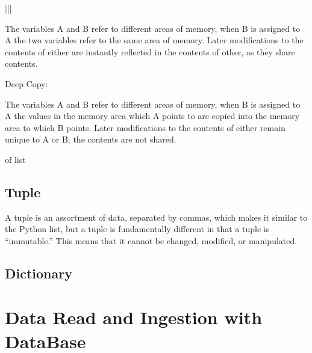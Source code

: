 \documentclass[letterpaper,12pt,english]{sphinxmanual}
\def\X{\mathbf{X}}
\begin{document}
\begin{savenotes}
\begin{tabular}[t]{|*{2}{\X{1}{2}|}}
\begin{footnote}[1]
The variables A and B refer to different areas of memory, when B is assigned to A the two variables refer to the same area of memory. Later modifications to the contents of either are instantly reflected in the contents of other, as they share contents.

Deep Copy:
\begin{quote}
\begin{sphinxfigure-in-table}
\centering

\noindent{}
\end{sphinxfigure-in-table}\relax
\end{quote}

The variables A and B refer to different areas of memory, when B is assigned to A the values in the memory area which A points to are copied into the memory area to which B points. Later modifications to the contents of either remain unique to A or B; the contents are not shared.
%
\end{footnote} of list
\\
\hline
\end{tabular}
\par
\sphinxattableend\end{savenotes}


\section{Tuple}
\label{\detokenize{struct:tuple}}
A tuple is an assortment of data, separated by commas, which makes it similar to the Python list, but a tuple is fundamentally different in that a tuple is “immutable.” This means that it cannot be changed, modified, or manipulated.


\section{Dictionary}
\label{\detokenize{struct:dictionary}}
  


\chapter{Data Read and Ingestion with DataBase}
\label{\detokenize{ingest:data-read-and-ingestion-with-database}}\label{\detokenize{ingest:ingest}}\label{\detokenize{ingest::doc}}
\end{document}
